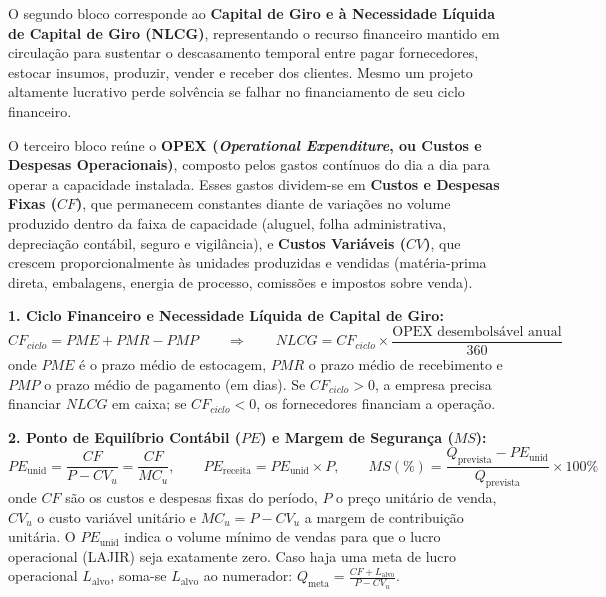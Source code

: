 O segundo bloco corresponde ao \textbf{Capital de Giro e à Necessidade Líquida de Capital de Giro (NLCG)}, representando o recurso financeiro mantido em circulação para sustentar o descasamento temporal entre pagar fornecedores, estocar insumos, produzir, vender e receber dos clientes. Mesmo um projeto altamente lucrativo perde solvência se falhar no financiamento de seu ciclo financeiro.

O terceiro bloco reúne o \textbf{OPEX (\textit{Operational Expenditure}, ou Custos e Despesas Operacionais)}, composto pelos gastos contínuos do dia a dia para operar a capacidade instalada. Esses gastos dividem-se em \textbf{Custos e Despesas Fixas ($CF$)}, que permanecem constantes diante de variações no volume produzido dentro da faixa de capacidade (aluguel, folha administrativa, depreciação contábil, seguro e vigilância), e \textbf{Custos Variáveis ($CV$)}, que crescem proporcionalmente às unidades produzidas e vendidas (matéria-prima direta, embalagens, energia de processo, comissões e impostos sobre venda).

\begin{boxFormula}
\textbf{1. Ciclo Financeiro e Necessidade Líquida de Capital de Giro:}
\[
  CF_{ciclo} = PME + PMR - PMP \qquad \Longrightarrow \qquad NLCG = CF_{ciclo} \times \frac{\text{OPEX desembolsável anual}}{360}
\]
onde $PME$ é o prazo médio de estocagem, $PMR$ o prazo médio de recebimento e $PMP$ o prazo médio de pagamento (em dias). Se $CF_{ciclo} > 0$, a empresa precisa financiar $NLCG$ em caixa; se $CF_{ciclo} < 0$, os fornecedores financiam a operação.

\vspace{6pt}
\textbf{2. Ponto de Equilíbrio Contábil ($PE$) e Margem de Segurança ($MS$):}
\[
  PE_{\text{unid}} = \frac{CF}{P - CV_u} = \frac{CF}{MC_u}, \qquad PE_{\text{receita}} = PE_{\text{unid}} \times P, \qquad MS(\%) = \frac{Q_{\text{prevista}} - PE_{\text{unid}}}{Q_{\text{prevista}}} \times 100\%
\]
onde $CF$ são os custos e despesas fixas do período, $P$ o preço unitário de venda, $CV_u$ o custo variável unitário e $MC_u = P - CV_u$ a margem de contribuição unitária. O $PE_{\text{unid}}$ indica o volume mínimo de vendas para que o lucro operacional (LAJIR) seja exatamente zero. Caso haja uma meta de lucro operacional $L_{\text{alvo}}$, soma-se $L_{\text{alvo}}$ ao numerador: $Q_{\text{meta}} = \frac{CF + L_{\text{alvo}}}{P - CV_u}$.
\end{boxFormula}


